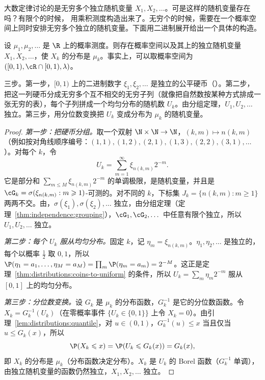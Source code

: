 大数定律讨论的是无穷多个独立随机变量 $X_1,X_2,\dots$。可是这样的随机变量存在吗？有限个的时候， 用乘积测度构造出来了。无穷个的时候，需要在一个概率空间上同时安排无穷多个独立的随机变量。下面用二进制展开给出一个具体的构造。

\begin{theorem}[独立随机变量序列的存在性]\label{thm:independence:existence}
设 $\mu_1,\mu_2,\dots$ 是 $\R$ 上的概率测度。则存在概率空间以及其上的独立随机变量 $X_1,X_2,\dots$，使 $X_k$ 的分布是 $\mu_k$。事实上，可以取概率空间为 $([0,1),\cR\cap[0,1),\lambda)$。
\end{theorem}

\begin{remark}[证明思路]
三步。第一步，$[0,1)$ 上的二进制数字 $\xi_1,\xi_2,\dots$ 是独立的公平硬币（）。第二步，把这一列硬币分成无穷多个互不相交的无穷子列（就像把自然数按某种方式排成一张无穷的表），每个子列拼成一个均匀分布的随机数 $U_k$。由分组定理，$U_1,U_2,\dots$ 独立。第三步，用分位数变换把 $U_k$ 变成分布为 $\mu_k$ 的随机变量。
\end{remark}

\begin{proof}
\emph{第一步：把硬币分组。}取一个双射 $\N\times\N\to\N$，$(k,m)\mapsto n(k,m)$（例如按对角线顺序编号：$(1,1),(1,2),(2,1),(1,3),(2,2),(3,1),\dots$）。对每个 $k$，令
\[
U_k=\sum_{m=1}^\infty\xi_{n(k,m)}2^{-m}.
\]
它是部分和 $\sum_{m\leqslant M}\xi_{n(k,m)}2^{-m}$ 的单调极限，是随机变量，并且是 $\cG_k=\sigma(\xi_{n(k,m)}:m\geqslant1)$-可测的。对不同的 $k$，下标集 $J_k=\{n(k,m):m\geqslant1\}$ 两两不交。由，$\sigma(\xi_1),\sigma(\xi_2),\dots$ 独立，由分组定理（定理~\ref{thm:independence:grouping}），$\cG_1,\cG_2,\dots$ 中任意有限个独立，所以 $U_1,U_2,\dots$ 独立。

\emph{第二步：每个 $U_k$ 服从均匀分布。}固定 $k$，记 $\eta_m=\xi_{n(k,m)}$。$\eta_1,\eta_2,\dots$ 是独立的，每个以概率 $\frac12$ 取 $0,1$，所以 $\P(\eta_1=a_1,\dots,\eta_M=a_M)=\prod_m\P(\eta_m=a_m)=2^{-M}$。这正是定理~\ref{thm:distributions:coins-to-uniform} 的条件，所以 $U_k=\sum_m\eta_m2^{-m}$ 服从 $[0,1]$ 上的均匀分布。

\emph{第三步：分位数变换。}设 $G_k$ 是 $\mu_k$ 的分布函数，$G_k^{-1}$ 是它的分位数函数。令 $X_k=G_k^{-1}(U_k)$（在零概率事件 $\{U_k\in\{0,1\}\}$ 上令 $X_k=0$）。由引理~\ref{lem:distributions:quantile}，对 $u\in(0,1)$，$G_k^{-1}(u)\leqslant x$ 当且仅当 $u\leqslant G_k(x)$，所以
\[
\P(X_k\leqslant x)=\P(U_k\leqslant G_k(x))=G_k(x),
\]
即 $X_k$ 的分布是 $\mu_k$（分布函数决定分布）。$X_k$ 是 $U_k$ 的 Borel 函数（$G_k^{-1}$ 单调），由独立随机变量的函数仍然独立，$X_1,X_2,\dots$ 独立。
\end{proof}

